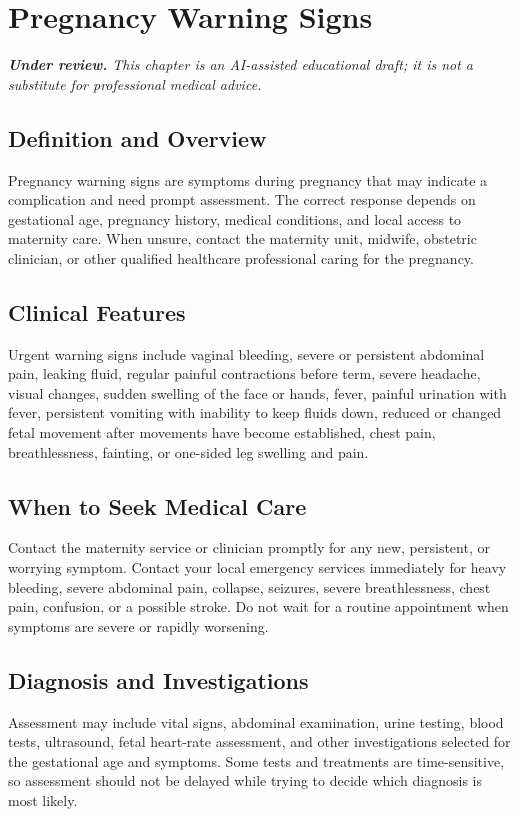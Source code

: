 \chapter{Pregnancy Warning Signs}

\medskip
\noindent\textit{\textbf{Under review.} This chapter is an AI-assisted educational draft; it is not a substitute for professional medical advice.}

\section*{Definition and Overview}
Pregnancy warning signs are symptoms during pregnancy that may indicate a complication and need prompt assessment. The correct response depends on gestational age, pregnancy history, medical conditions, and local access to maternity care. When unsure, contact the maternity unit, midwife, obstetric clinician, or other qualified healthcare professional caring for the pregnancy.

\section*{Clinical Features}
Urgent warning signs include vaginal bleeding, severe or persistent abdominal pain, leaking fluid, regular painful contractions before term, severe headache, visual changes, sudden swelling of the face or hands, fever, painful urination with fever, persistent vomiting with inability to keep fluids down, reduced or changed fetal movement after movements have become established, chest pain, breathlessness, fainting, or one-sided leg swelling and pain.

\section*{When to Seek Medical Care}
Contact the maternity service or clinician promptly for any new, persistent, or worrying symptom. Contact your local emergency services immediately for heavy bleeding, severe abdominal pain, collapse, seizures, severe breathlessness, chest pain, confusion, or a possible stroke. Do not wait for a routine appointment when symptoms are severe or rapidly worsening.

\section*{Diagnosis and Investigations}
Assessment may include vital signs, abdominal examination, urine testing, blood tests, ultrasound, fetal heart-rate assessment, and other investigations selected for the gestational age and symptoms. Some tests and treatments are time-sensitive, so assessment should not be delayed while trying to decide which diagnosis is most likely.

